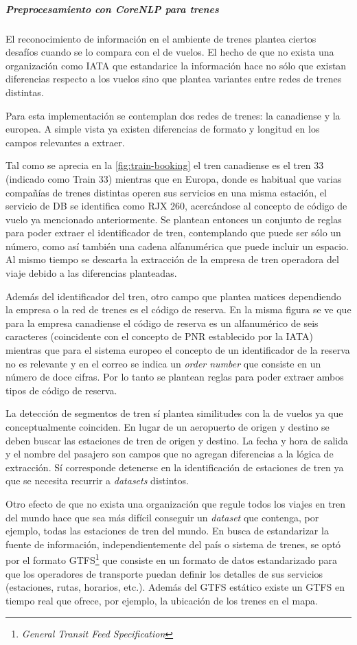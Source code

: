\subparagraph{Preprocesamiento con CoreNLP para trenes}%
\label{subpar:extraction-trains}

El reconocimiento de información en el ambiente de trenes plantea ciertos desafíos cuando se lo compara con el de
vuelos.
El hecho de que no exista una organización como IATA que estandarice la información hace no sólo que existan diferencias
respecto a los vuelos sino que plantea variantes entre redes de trenes distintas.

Para esta implementación se contemplan dos redes de trenes: la canadiense y la europea.
A simple vista ya existen diferencias de formato y longitud en los campos relevantes a extraer.

Tal como se aprecia en la \autoref{fig:train-booking} el tren canadiense es el tren 33 (indicado como Train 33) mientras
que en Europa, donde es habitual que varias compañías de trenes distintas operen sus servicios en una misma estación,
el servicio de DB se identifica como RJX 260, acercándose al concepto de código de vuelo ya mencionado anteriormente.
Se plantean entonces un conjunto de reglas para poder extraer el identificador de tren, contemplando que puede ser sólo
un número, como así también una cadena alfanumérica que puede incluir un espacio.
Al mismo tiempo se descarta la extracción de la empresa de tren operadora del viaje debido a las diferencias planteadas.

Además del identificador del tren, otro campo que plantea matices dependiendo la empresa o la red de trenes es el código
de reserva.
En la misma figura se ve que para la empresa canadiense el código de reserva es un alfanumérico de seis caracteres
(coincidente con el concepto de PNR establecido por la IATA) mientras que para el sistema europeo el concepto de un
identificador de la reserva no es relevante y en el correo se indica un \textit{order number} que consiste en un número
de doce cifras.
Por lo tanto se plantean reglas para poder extraer ambos tipos de código de reserva.

La detección de segmentos de tren sí plantea similitudes con la de vuelos ya que conceptualmente coinciden.
En lugar de un aeropuerto de origen y destino se deben buscar las estaciones de tren de origen y destino.
La fecha y hora de salida y el nombre del pasajero son campos que no agregan diferencias a la lógica de extracción.
Sí corresponde detenerse en la identificación de estaciones de tren ya que se necesita recurrir a
\textit{datasets} distintos.

Otro efecto de que no exista una organización que regule todos los viajes en tren del mundo hace que sea más difícil
conseguir un \textit{dataset} que contenga, por ejemplo, todas las estaciones de tren del mundo.
En busca de estandarizar la fuente de información, independientemente del país o sistema de trenes, se optó por el
formato GTFS\footnote{\textit{General Transit Feed Specification}} que consiste en un formato de datos estandarizado
para que los operadores de transporte puedan definir los detalles de sus servicios (estaciones, rutas, horarios, etc.).
Además del GTFS estático existe un GTFS en tiempo real que ofrece, por ejemplo, la ubicación de los trenes en el mapa.

